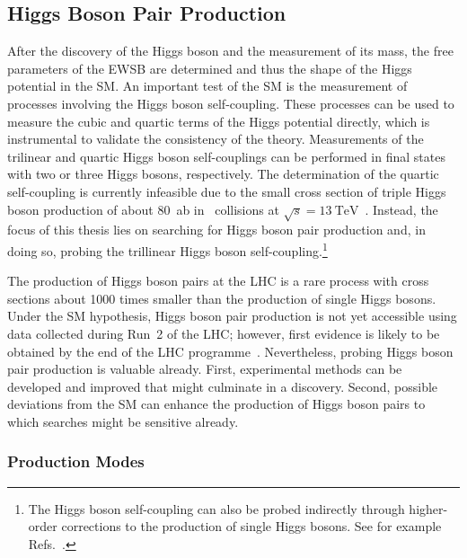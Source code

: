 \subsection{Higgs Boson Pair Production}%
\label{fig:theory_higgs_pair_prod}


After the discovery of the Higgs boson and the measurement of its mass, the free
parameters of the EWSB %
are determined and thus the shape of the Higgs potential in the SM. An important
test of the SM is the measurement of processes involving the Higgs boson
self-coupling. These processes can be used to measure the cubic and quartic
terms of the Higgs potential directly, which is instrumental to validate the
consistency of the theory. Measurements of the trilinear and quartic Higgs boson
self-couplings can be performed in final states with two or three Higgs bosons,
respectively. The determination of the quartic self-coupling is currently
infeasible due to the small cross section of triple Higgs boson production of
about \SI{80}{\atto\barn} in \pp~collisions at
$\sqrt{s} = \SI{13}{\TeV}$~\cite{Maltoni:2014eza}. Instead, the focus of this
thesis lies on searching for Higgs boson pair production and, in doing so,
probing the trillinear Higgs boson self-coupling.\footnote{The Higgs boson
  self-coupling can also be probed indirectly through higher-order corrections
  to the production of single Higgs bosons. See for example
  Refs.~\cite{Degrassi:2016wml,ATLAS-CONF-2022-050}.}


The production of Higgs boson pairs at the LHC is a rare process with
cross sections about 1000 times smaller than the production of single Higgs
bosons. Under the SM hypothesis, Higgs boson pair production is not yet
accessible using data collected during Run~2 of the LHC; however, first evidence
is likely to be obtained by the end of the LHC
programme~\cite{ATL-PHYS-PUB-2022-005}. Nevertheless, probing Higgs boson pair
production is valuable already. First, experimental methods can be developed and
improved that might culminate in a discovery. Second, possible deviations from
the SM can enhance the production of Higgs boson pairs to which searches might
be sensitive already.


\subsubsection{Production Modes}%


